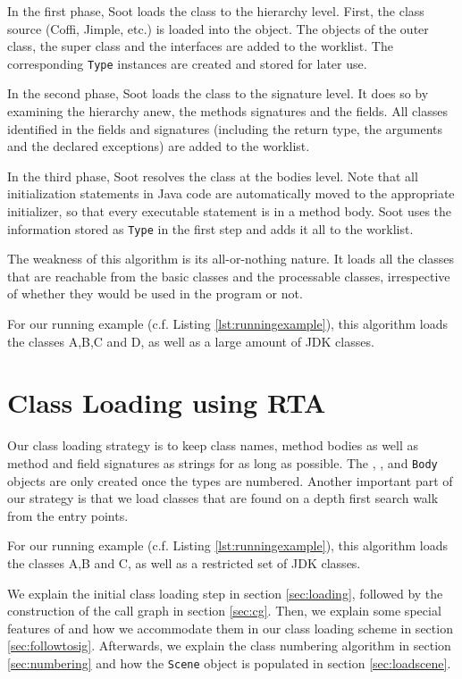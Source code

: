 \documentclass[preprint]{sigplanconf}
\begin{document}
In the first phase, Soot loads the class to the hierarchy level. First, the class source (Coffi, Jimple, etc.) is loaded into the \sootclass object.
The \sootclass objects of the outer class, the super class and the interfaces are added to the worklist. The corresponding {\tt Type} instances are created and stored for later use.

In the second phase, Soot loads the class to the signature level. It does so by examining the hierarchy anew, the methods signatures and the fields. All classes identified in the fields and signatures (including the return type, the arguments and the declared exceptions) are added to the worklist.

In the third phase, Soot resolves the class at the bodies level. Note that all initialization statements in Java code are automatically moved to the appropriate initializer, so that every executable statement is in a method body. Soot uses the information stored as {\tt Type} in the first step and adds it all to the worklist.

The weakness of this algorithm is its all-or-nothing nature. It loads all the classes that are reachable from the basic classes and the processable classes, irrespective of whether they would be used in the program or not.

For our running example (c.f. Listing \ref{lst:runningexample}), this algorithm loads the classes A,B,C and D, as well as a large amount of JDK classes.

\section{Class Loading using RTA}
\label{sec:new-cl}
Our class loading strategy is to keep class names, method bodies as well as method and field signatures as strings for as long as possible.
The \sootclass, \sootmethod, \sootfield and {\tt Body} objects are only created once the types are numbered. Another important part of our strategy is that we load classes that are found on a depth first search walk from the entry points.

For our running example (c.f. Listing \ref{lst:runningexample}), this algorithm loads the classes A,B and C, as well as a restricted set of JDK classes. %

We explain the initial class loading step in section \ref{sec:loading}, followed by the construction of the call graph in section \ref{sec:cg}. Then, we explain some special features of \rb and how we accommodate them in our class loading scheme in section \ref{sec:followtosig}. Afterwards, we explain the class numbering algorithm in section \ref{sec:numbering} and how the {\tt Scene} object is populated in section \ref{sec:loadscene}.
\end{document}
